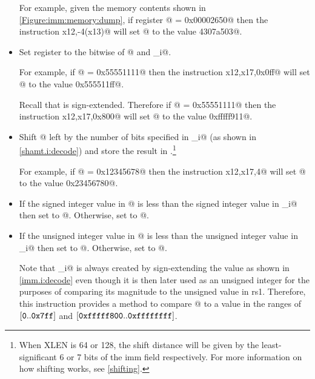 \begin{itemize}
For example, given the memory contents shown in \autoref{Figure:imm:memory:dump},
if register @ = \verb@0x00002650@ then the instruction
\verb@lw x12,-4(x13)@ will set @ to the value \verb@4307a503@.


\item{}
\label{insn:ori}

Set register \verb@rd@ to the bitwise \verb@or@ of @ and \verb@imm_i@.

For example, if @ = \verb@0x55551111@ then the instruction
\verb@ori x12,x17,0x0ff@ will set @ to the value \verb@0x555511ff@.

Recall that \verb@imm@ is sign-extended.
Therefore if @ = \verb@0x55551111@ then the instruction
\verb@ori x12,x17,0x800@ will set @ to the value \verb@0xfffff911@.

\item{}
\label{insn:slli}

Shift @ left by the number of bits specified in \verb@shamt_i@
(as shown in \autoref{shamt.i:decode})
and store the result in \verb@rd@.\footnote{\label{shifti:xlen}
When XLEN is 64 or 128, the shift distance will be given by the least-significant
6 or 7 bits of the imm field respectively.
For more information on how shifting works, see \autoref{shifting}.}

For example, if @ = \verb@0x12345678@ then the instruction
\verb@slli x12,x17,4@ will set @ to the value \verb@0x23456780@.

\item{}
\label{insn:slti}

If the signed integer value in @ is less than the
signed integer value in \verb@imm_i@ then set \verb@rd@ to @.
Otherwise, set \verb@rd@ to @.

\item{}
\label{insn:sltiu}

If the unsigned integer value in @ is less than the
unsigned integer value in \verb@imm_i@ then set \verb@rd@ to @.
Otherwise, set \verb@rd@ to @.

Note that \verb@imm_i@ is always created by sign-extending the \verb@imm@ value
as shown in \autoref{imm.i:decode} even though it is then later used as an unsigned
integer for the purposes of comparing its magnitude to the unsigned value in rs1.
Therefore, this instruction provides a method to compare @ to a value
in the ranges of
$[\text{\tt 0}..\text{\tt 0x7ff}]$ and $[\text{\tt 0xfffff800}..\text{\tt 0xffffffff}]$.


\end{itemize}
